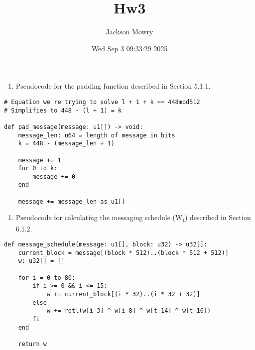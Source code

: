 \documentclass[11pt]{article}
\author{Jackson Mowry}
\date{Wed Sep  3 09:33:29 2025}
\title{Hw3}
\begin{document}
\maketitle
\begin{enumerate}
\item Pseudocode for the padding function described in Section 5.1.1.
\end{enumerate}
\begin{verbatim}
# Equation we're trying to solve l + 1 + k == 448mod512
# Simplifies to 448 - (l + 1) = k

def pad_message(message: u1[]) -> void:
    message_len: u64 = length of message in bits
    k = 448 - (message_len + 1)

    message += 1
    for 0 to k:
        message += 0
    end

    message += message_len as u1[]

\end{verbatim}

\begin{enumerate}
\item Pseudocode for calculating the messaging schedule (W\textsubscript{t}) described in Section 6.1.2.
\end{enumerate}
\begin{verbatim}
def message_schedule(message: u1[], block: u32) -> u32[]:
    current_block = message[(block * 512)..(block * 512 + 512)]
    w: u32[] = []

    for i = 0 to 80:
        if i >= 0 && i <= 15:
            w += current_block[(i * 32)..(i * 32 + 32)]
        else
            w += rotl(w[i-3] ^ w[i-8] ^ w[t-14] ^ w[t-16])
        fi
    end

    return w
\end{verbatim}
\end{document}
